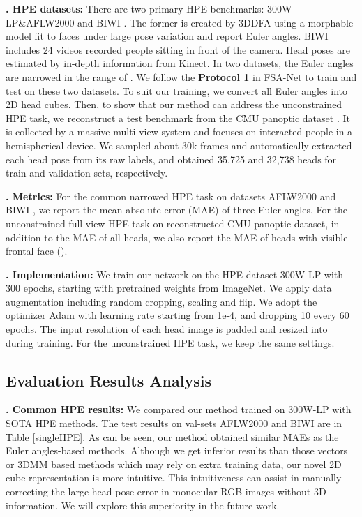 \documentclass{article}
\begin{document}
{\bf {}. HPE datasets:}
There are two primary HPE benchmarks: 300W-LP\&AFLW2000 \cite{zhu2016face} and BIWI \cite{fanelli2013random}. The former is created by 3DDFA \cite{zhu2016face} using a morphable model fit to faces under large pose variation and report Euler angles. BIWI includes 24 videos recorded people sitting in front of the camera. Head poses are estimated by in-depth information from Kinect. In two datasets, the Euler angles are narrowed in the range of . We follow the {\bf Protocol 1} in FSA-Net \cite{yang2019fsa} to train and test on these two datasets. To suit our training, we convert all Euler angles into 2D head cubes. Then, to show that our method can address the unconstrained HPE task, we reconstruct a test benchmark from the CMU panoptic dataset \cite{joo2015panoptic}. It is collected by a massive multi-view system and focuses on interacted people in a hemispherical device. We sampled about 30k frames and automatically extracted each head pose from its raw labels, and obtained 35,725 and 32,738 heads for train and validation sets, respectively.

{\bf {}. Metrics:}
For the common narrowed HPE task on datasets AFLW2000 \cite{zhu2016face} and BIWI \cite{fanelli2013random}, we report the mean absolute error (MAE) of three Euler angles. For the unconstrained full-view HPE task on reconstructed CMU panoptic dataset, in addition to the MAE of all heads, we also report the MAE of heads with visible frontal face (). 

{\bf {}. Implementation:}
We train our network on the HPE dataset 300W-LP with 300 epochs, starting with pretrained weights from ImageNet. We apply data augmentation including random cropping, scaling and flip. We adopt the optimizer Adam with learning rate starting from 1e-4, and dropping 10 every 60 epochs. The input resolution of each head image is padded and resized into  during training. For the unconstrained HPE task, we keep the same settings.


\subsection{Evaluation Results Analysis}

{\bf {}. Common HPE results:}
We compared our method trained on 300W-LP with SOTA HPE methods. The test results on val-sets AFLW2000 and BIWI are in Table \ref{singleHPE}. As can be seen, our method obtained similar MAEs as the Euler angles-based methods. Although we get inferior results than those vectors or 3DMM based methods which may rely on extra training data, our novel 2D cube representation is more intuitive. This intuitiveness can assist in manually correcting the large head pose error in monocular RGB images without 3D information. We will explore this superiority in the future work.
\end{document}

